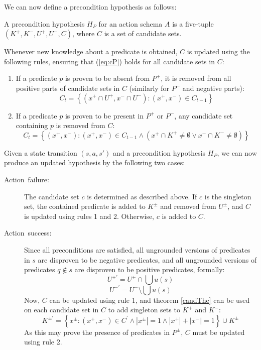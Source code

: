\documentclass[../Master.tex]{subfiles}
\begin{document}
We can now define a precondition hypothesis as follows: \begin{defn} A
precondition hypothesis $H_{P}$ for an action schema $A$ is a five-tuple
$\left(K^{+},K^{-},U^{+},U^{-},C\right)$, where $C$ is a set of candidate sets.
\end{defn} Whenever new knowledge about a predicate is obtained, $C$ is updated
using the following rules, ensuring that (\ref{eq:cP}) holds for all candidate
sets in $C$:
\begin{enumerate}
    \item If a predicate $p$ is proven to be absent
from $P^{+}$, it is removed from all positive parts of candidate sets in $C$
(similarly for $P^{-}$ and negative parts):
    \[ C_t = \left\{ \left(x^{+}\cap
U^{+},x^{-}\cap U^{-}\right):\left(x^{+},x^{-}\right)\in C_{t-1} \right\} \]

    \item If a predicate $p$ is proven to be present in $P^{+}$ or $P^{-}$, any candidate set containing $p$ is removed from $C$:
    \[ C_t = \left\{ \left( x^{+},x^{-} \right) : \left(x^{+},x^{-}\right)\in C_{t-1} \land\left(x^{+}\cap
K^{+}\neq\emptyset\lor x^{-}\cap K^{-}\neq\emptyset\right)\right\} \]

\end{enumerate} Given a state transition $\left(s,a,s'\right)$ and a
precondition hypothesis $H_{P}$, we can now produce an updated hypothesis by the
following two cases: \begin{description} \item [{Action\ failure:}] The
candidate set $c$ is determined as described above. If $c$ is the singleton set,
the contained predicate is added to $K^{\pm}$ and removed from $U^{\pm}$, and
$C$ is updated using rules 1 and 2. Otherwise, $c$ is added to $C$. \item
[{Action\ success:}] Since all preconditions are satisfied, all ungrounded
versions of predicates in $s$ are disproven to be negative predicates, and all
ungrounded versions of predicates $q\notin s$ are disproven to be positive
predicates, formally: \[ U^{+\prime}=U^{+}\cap\bigcup u\left(s\right) \] \[
U^{-\prime}=U^{-}\setminus\bigcup u\left(s\right) \] Now, $C$ can be updated
using rule 1, and theorem \ref{candThe} can be used on each candidate set in $C$
to add singleton sets to $K^{+}$ and $K^{-}$: \[ K^{\pm\prime}=\left\{
x^{\pm}:\left(x^{+},x^{-}\right)\in
C^{\prime}\land\left|x^{\pm}\right|=1\land\left|x^{+}\right|+\left|x^{-}\right|=1\right\}
\cup K^{\pm} \] As this may prove the presence of predicates in $P^{\pm}$, $C$
must be updated using rule 2. \end{description}
\end{document}
